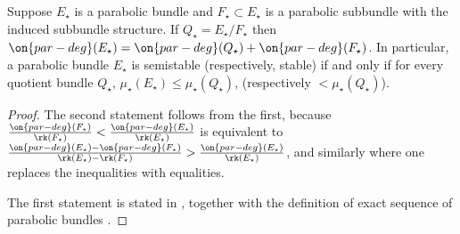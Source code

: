 \begin{lemma}
\notready
	\label{lemma:quotient-semistable}
	Suppose $E_\star$ is a parabolic bundle and $F_\star \subset E_\star$ is
	a parabolic subbundle with the induced subbundle structure. If $Q_\star
	= E_\star/F_\star$ then $\on{par-deg}(E_\star) = \on{par-deg}(Q_\star) +
	\on{par-deg}(F_\star)$.
	In particular, a parabolic bundle $E_\star$ is semistable (respectively,
	stable) if and only if for every quotient
	bundle $Q_\star$, $\mu_\star(E_\star) \leq \mu_\star(Q_\star)$, (respectively $<
	\mu_\star(Q_\star)$).
\end{lemma}
\begin{proof}
	The second statement follows from the first, because
	$\frac{\on{par-deg}(F_\star)}{\rk(F_\star)} <
	\frac{\on{par-deg}(E_\star)}{\rk(E_\star)}$
	is equivalent to
	$\frac{\on{par-deg}(E_\star)- \on{par-deg}(F_\star)}{\rk(E_\star) -
	\rk(F_\star)} >
	\frac{\on{par-deg}(E_\star)}{\rk(E_\star)}$, and similarly where one
	replaces the inequalities with equalities.

	The first statement is stated in
	\cite[Part 3, \S1.A, p. 69, Remark
	3]{seshadri:fibres-vectoriels-sur-les-courbes-algebriques},
	together with the definition of exact sequence of parabolic bundles
	\cite[Part 3, \S1.A, p. 68]{seshadri:fibres-vectoriels-sur-les-courbes-algebriques}.
%
\end{proof}

